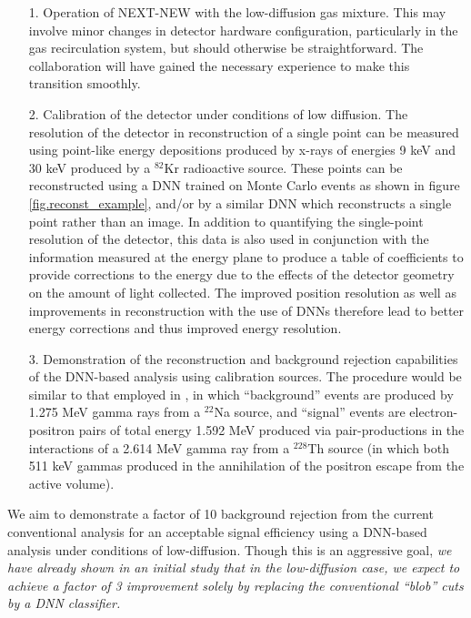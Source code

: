 \documentclass[11pt,a4paper]{article}
\begin{document}
\begin{enumerate}
	\item[1.] Operation of NEXT-NEW with the low-diffusion gas mixture. This may involve minor changes in detector hardware configuration, particularly in the gas recirculation system, but should otherwise be straightforward. The collaboration will have gained the necessary experience to make this transition smoothly.
	\item[2.] Calibration of the detector under conditions of low diffusion. The resolution of the detector in reconstruction of a single point can be measured using point-like energy depositions produced by x-rays of energies 9 keV and 30 keV produced by a $^{82}$Kr radioactive source. These points can be reconstructed using a DNN trained on Monte Carlo events as shown in figure \ref{fig.reconst_example}, and/or by a similar DNN which reconstructs a single point rather than an image. In addition to quantifying the single-point resolution of the detector, this data is also used in conjunction with the information measured at the energy plane to produce a table of coefficients to provide corrections to the energy due to the effects of the detector geometry on the amount of light collected. The improved position resolution as well as improvements in reconstruction with the use of DNNs therefore lead to better energy corrections and thus improved energy resolution.
	\item[3.] Demonstration of the reconstruction and background rejection capabilities of the DNN-based analysis using calibration sources. The procedure would be similar to that employed in \cite{NEXT_topology}, in which ``background'' events are produced by 1.275 MeV gamma rays from a $^{22}$Na source, and ``signal'' events are electron-positron pairs of total energy 1.592 MeV produced via pair-productions in the interactions of a 2.614 MeV gamma ray from a $^{228}$Th source (in which both 511 keV gammas produced in the annihilation of the positron escape from the active volume).
\end{enumerate}

We aim to demonstrate a factor of 10 background rejection from the current conventional analysis for an acceptable signal efficiency using a DNN-based analysis under conditions of low-diffusion. Though this is an aggressive goal, \emph{we have already shown in an initial study that in the low-diffusion case, we expect to achieve a factor of 3 improvement solely by replacing the conventional ``blob'' cuts by a DNN classifier.}\\
\end{document}
